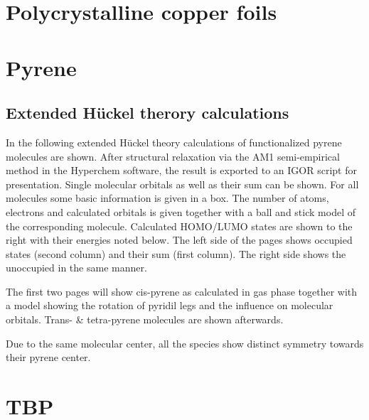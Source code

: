 \documentclass[
twoside,				%
BCOR=12mm,				%
headings=normal,		%
headsepline,			%
footsepline,			%
plainfootsepline,		%
]
{scrbook}
\begin{document}
\begin{appendices}
\addappheadtotoc
\chapter{Polycrystalline copper foils}
  
%  
\chapter{Pyrene}



\section{\textbf{E}xtended \textbf{H}ückel \textbf{t}herory calculations}
In the following extended Hückel theory calculations of functionalized pyrene molecules are shown. After structural relaxation via the AM1 semi-empirical method in the Hyperchem software, the result is exported to an IGOR script for presentation. Single molecular orbitals as well as their sum can be shown. For all molecules some basic information is given in a box. The number of atoms, electrons and calculated orbitals is given together with a ball and stick model of the corresponding molecule. Calculated HOMO/LUMO states are shown to the right with their energies noted below.
The left side of the pages shows occupied states (second column) and their sum (first column). The right side shows the unoccupied in the same manner.

The first two pages will show cis-pyrene as calculated in gas phase together with a model showing the rotation of pyridil legs and the influence on molecular orbitals. Trans- \& tetra-pyrene molecules are shown afterwards.

Due to the same molecular center, all the species show distinct symmetry towards their pyrene center. 

%
%
  
  
  
  
\restoregeometry
 \chapter{TBP}
 
% 

\end{appendices}
\end{document}
